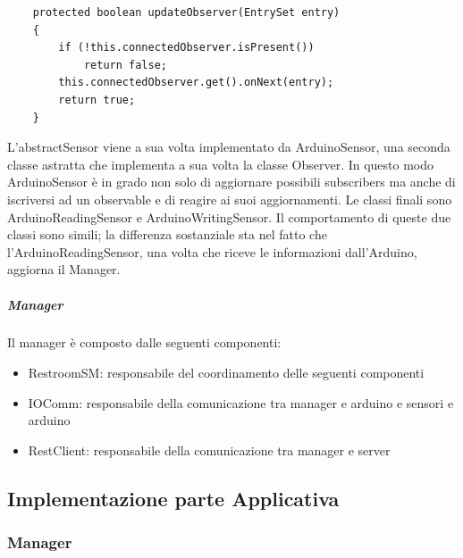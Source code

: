 \documentclass[12pt]{article}
\begin{document}
\begin{lstlisting}
	protected boolean updateObserver(EntrySet entry)
	{
		if (!this.connectedObserver.isPresent())
			return false;
		this.connectedObserver.get().onNext(entry);
		return true;
	}
\end{lstlisting}
L'abstractSensor viene a sua volta implementato da ArduinoSensor, una seconda classe astratta che implementa a sua volta la classe Observer. In questo modo ArduinoSensor è in grado non solo di aggiornare possibili subscribers ma anche di iscriversi ad un observable e di reagire ai suoi aggiornamenti.
Le classi finali sono ArduinoReadingSensor e ArduinoWritingSensor.
Il comportamento di queste due classi sono simili; la differenza sostanziale sta nel fatto che l'ArduinoReadingSensor, una volta che riceve le informazioni dall'Arduino, aggiorna il Manager. 
\subparagraph{Manager}
Il manager è composto dalle seguenti componenti:
\begin{itemize}
\item RestroomSM: responsabile del coordinamento delle seguenti componenti
\item IOComm: responsabile della comunicazione tra manager e arduino e sensori e arduino
\item RestClient: responsabile della comunicazione tra manager e server
\end{itemize}
\newpage
\subsection{Implementazione parte Applicativa}
\subsubsection{Manager}
\end{document}
